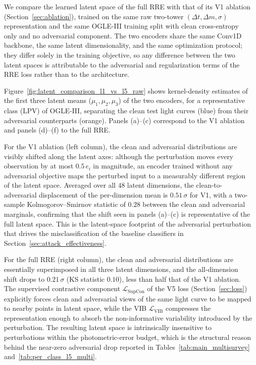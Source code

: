 \documentclass{aa}
\begin{document}
We compare the learned latent space of the full RRE with that of its
V1 ablation (Section~\ref{sec:ablation}), trained on the same raw
two-tower $(\Delta t, \Delta m, \sigma)$ representation and the same
OGLE-III training split with clean cross-entropy only and no adversarial
component. The two encoders share the same Conv1D backbone, the same
latent dimensionality, and the same optimization protocol; they differ
solely in the training objective, so any difference between the two latent
spaces is attributable to the adversarial and regularization terms of the
RRE loss rather than to the architecture.

Figure~\ref{fig:latent_comparison_l1_vs_l5_raw} shows kernel-density
estimates of the first three latent means ($\mu_1, \mu_2, \mu_3$) of the
two encoders, for a representative class (LPV) of OGLE-III, separating the
clean test light curves (blue) from their adversarial counterparts
(orange). Panels (a)--(c) correspond to the V1 ablation and panels
(d)--(f) to the full RRE.

For the V1 ablation (left column), the clean and adversarial distributions
are visibly shifted along the latent axes: although the perturbation moves
every observation by at most $0.5\,e_i$ in magnitude, an encoder trained
without any adversarial objective maps the perturbed input to a measurably
different region of the latent space. Averaged over all $48$ latent
dimensions, the clean-to-adversarial displacement of the per-dimension
mean is $0.51\,\sigma$ for V1, with a two-sample Kolmogorov--Smirnov
statistic of $0.28$ between the clean and adversarial marginals,
confirming that the shift seen in panels (a)--(c) is representative of the
full latent space. This is the latent-space footprint of the adversarial
perturbation that drives the misclassification of the baseline classifiers
in Section~\ref{sec:attack_effectiveness}.

For the full RRE (right column), the clean and adversarial distributions
are essentially superimposed in all three latent dimensions, and the
all-dimension shift drops to $0.21\,\sigma$ (KS statistic $0.10$), less
than half that of the V1 ablation. The supervised
contrastive component $\mathcal{L}_{\mathrm{SupCon}}$ of the V5 loss
(Section~\ref{sec:loss}) explicitly forces clean and adversarial views of
the same light curve to be mapped to nearby points in latent space, while
the VIB $\mathcal{L}_{\mathrm{VIB}}$
compresses the representation enough to absorb the non-informative
variability introduced by the perturbation. The resulting latent space is
intrinsically insensitive to perturbations within the photometric-error
budget, which is the structural reason behind the near-zero adversarial
drop reported in Tables~\ref{tab:main_multisurvey}
and~\ref{tab:per_class_l5_multi}.
\end{document}
